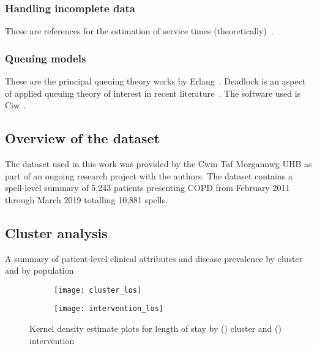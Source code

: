 \subsubsection{Handling incomplete data}

These are references for the estimation of service times
(theoretically)~\cite{Djabali2018,Goldenshluger2016,Kumar2010}.

\subsubsection{Queuing models}

These are the principal queuing theory works by
Erlang~\cite{Erlang1917,Erlang1920}. Deadlock is an aspect of applied queuing
theory of interest in recent literature~\cite{Palmer2018}. The software used is
Ciw~\cite{Palmer2019}.


\subsection{Overview of the dataset}\label{subsec:overview}

The dataset used in this work was provided by the Cwm Taf Morgannwg UHB as part
of an ongoing research project with the authors. The dataset contains a
spell-level summary of 5,243 patients presenting COPD from February 2011 through
March 2019 totalling 10,881 spells. 

\subsection{Cluster analysis}\label{subsec:clusters}

\begin{table}
    \centering
    \resizebox{\textwidth}{!}{%
        
    }\caption{A summary of patient-level clinical attributes and disease
    prevalence by cluster and by population}\label{tab:summary}
\end{table}

\begin{figure}
    \centering
    \begin{subfigure}{\halfimgwidth}
        \texttt{[image: cluster\_los]}
        \caption{}\label{fig:cluster_los}
    \end{subfigure}\hfill%
    \begin{subfigure}{\halfimgwidth}
        \texttt{[image: intervention\_los]}
        \caption{}\label{fig:intervention_los}
    \end{subfigure}
    \caption{%
        Kernel density estimate plots for length of stay by
        () cluster and ()
        intervention
    }\label{fig:los_kde}
\end{figure}

